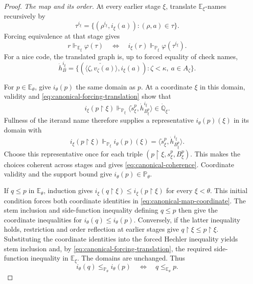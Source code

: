 \documentclass[10pt,a4paper]{amsart}
\theoremstyle{definition}
\theoremstyle{remark}
\newcommand{\PP}{\mathbb P}
\newcommand{\EE}{\mathbb E}
\begin{document}
\begin{proof}
\emph{The map and its order.}
At every earlier stage \(\xi\), translate
\(\EE_\xi\)-names recursively by
\[
 \tau^{i_\xi}=
 \{(\rho^{i_\xi},i_\xi(a)):(\rho,a)\in\tau\}.
\]
Forcing equivalence at that stage gives
\begin{equation}\label{eq:canonical-forcing-translation}
 r\Vdash_{\EE_\xi}\varphi(\tau)
 \quad\Longleftrightarrow\quad
 i_\xi(r)\Vdash_{\PP_\xi}\varphi(\tau^{i_\xi}).
\end{equation}
For a nice code, the translated graph is, up to forced
equality of check names,
\[
 \dot h_B^{i_\xi}=
 \{(\check{\langle\zeta,v_\zeta(a)\rangle},i_\xi(a)):
                         \zeta<\kappa,\ a\in A_\zeta\}.
\]

For \(p\in\EE_\theta\), give \(i_\theta(p)\) the
same domain as \(p\). At a coordinate \(\xi\) in
this domain, validity and
\eqref{eq:canonical-forcing-translation} show that
\[
 i_\xi(p\restriction\xi)\Vdash_{\PP_\xi}
  \langle\check s_\xi^p,\dot h_{B_\xi^p}^{i_\xi}\rangle
                                      \in\dot{\mathbb Q}_\xi.
\]
Fullness of the iterand name therefore supplies a
representative \(i_\theta(p)(\xi)\) in its domain with
\begin{equation}\label{eq:canonical-map-coordinate}
 i_\xi(p\restriction\xi)\Vdash_{\PP_\xi}
 i_\theta(p)(\xi)=
       \langle\check s_\xi^p,\dot h_{B_\xi^p}^{i_\xi}\rangle.
\end{equation}
Choose this representative once for each triple
\((p\restriction\xi,s_\xi^p,B_\xi^p)\). This makes
the choices coherent across stages and gives
\eqref{eq:canonical-coherence}. Coordinate validity and
the support bound give \(i_\theta(p)\in\PP_\theta\).

If \(q\leq p\) in \(\EE_\theta\), induction gives
\(i_\xi(q\restriction\xi)\leq
i_\xi(p\restriction\xi)\) for every \(\xi<\theta\).
This initial condition forces both coordinate identities
in \eqref{eq:canonical-map-coordinate}. The stem inclusion
and side-function inequality defining \(q\leq p\) then
give the coordinate inequalities for
\(i_\theta(q)\leq i_\theta(p)\). Conversely, if the
latter inequality holds, restriction and order reflection
at earlier stages give
\(q\restriction\xi\leq p\restriction\xi\).
Substituting the coordinate identities into the forced
Hechler inequality yields stem inclusion and, by
\eqref{eq:canonical-forcing-translation}, the required
side-function inequality in \(\EE_\xi\). The domains
are unchanged. Thus
\begin{equation}\label{eq:canonical-order-reflection}
 i_\theta(q)\leq_{\PP_\theta}i_\theta(p)
              \quad\Longleftrightarrow\quad
 q\leq_{\EE_\theta}p.
\end{equation}


\end{proof}
\end{document}
